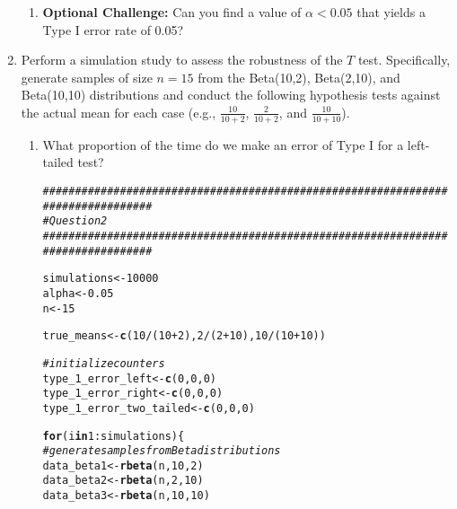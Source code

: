 \documentclass{article}\usepackage[]{graphicx}\usepackage[]{xcolor}
\makeatletter
\newcommand{\hlnum}[1]{\textcolor[rgb]{0.686,0.059,0.569}{#1}}%
\newcommand{\hlcom}[1]{\textcolor[rgb]{0.678,0.584,0.686}{\textit{#1}}}%
\newcommand{\hlopt}[1]{\textcolor[rgb]{0,0,0}{#1}}%
\newcommand{\hldef}[1]{\textcolor[rgb]{0.345,0.345,0.345}{#1}}%
\newcommand{\hlkwa}[1]{\textcolor[rgb]{0.161,0.373,0.58}{\textbf{#1}}}%
\newcommand{\hlkwb}[1]{\textcolor[rgb]{0.69,0.353,0.396}{#1}}%
\newcommand{\hlkwd}[1]{\textcolor[rgb]{0.737,0.353,0.396}{\textbf{#1}}}%
\newenvironment{kframe}{%
 \def\at@end@of@kframe{}%
 \ifinner\ifhmode%
  \def\at@end@of@kframe{\end{minipage}}%
  \begin{minipage}{\columnwidth}%
 \fi\fi%
 \def\FrameCommand##1{\hskip\@totalleftmargin \hskip-\fboxsep
 \colorbox{shadecolor}{##1}\hskip-\fboxsep
     \hskip-\linewidth \hskip-\@totalleftmargin \hskip\columnwidth}%
 \MakeFramed {\advance\hsize-\width
   \@totalleftmargin\z@ \linewidth\hsize
   \@setminipage}}%
 {\par\unskip\endMakeFramed%
 \at@end@of@kframe}
\newenvironment{knitrout}{}{} %
\makeatother
\begin{document}
\begin{enumerate}
\begin{enumerate}
  \item \textbf{Optional Challenge:} Can you find a value of $\alpha<0.05$ that yields a 
  Type I error rate of 0.05?
\end{enumerate}
  \item Perform a simulation study to assess the robustness of the $T$ test. 
  Specifically, generate samples of size $n=15$ from the Beta(10,2), Beta(2,10), 
  and Beta(10,10) distributions and conduct the following hypothesis tests against 
  the actual mean for each case (e.g., $\frac{10}{10+2}$, $\frac{2}{10+2}$, and 
  $\frac{10}{10+10}$). 
  \begin{enumerate}
    \item What proportion of the time do we make an error of Type I for a
    left-tailed test?
    
\begin{knitrout}\scriptsize
{}\color{fgcolor}\begin{kframe}
\begin{alltt}
    \hlcom{################################################################################}
  \hlcom{# Question 2}
  \hlcom{################################################################################}

  \hldef{simulations} \hlkwb{<-} \hlnum{10000}
  \hldef{alpha} \hlkwb{<-} \hlnum{0.05}
  \hldef{n} \hlkwb{<-} \hlnum{15}

  \hldef{true_means} \hlkwb{<-} \hlkwd{c}\hldef{(}\hlnum{10} \hlopt{/} \hldef{(}\hlnum{10}\hlopt{+}\hlnum{2}\hldef{),} \hlnum{2} \hlopt{/} \hldef{(}\hlnum{2}\hlopt{+}\hlnum{10}\hldef{),} \hlnum{10}\hlopt{/}\hldef{(}\hlnum{10}\hlopt{+}\hlnum{10}\hldef{))}

  \hlcom{# initialize counters}
  \hldef{type_1_error_left} \hlkwb{<-} \hlkwd{c}\hldef{(}\hlnum{0}\hldef{,}\hlnum{0}\hldef{,}\hlnum{0}\hldef{)}
  \hldef{type_1_error_right}\hlkwb{<-} \hlkwd{c}\hldef{(}\hlnum{0}\hldef{,}\hlnum{0}\hldef{,}\hlnum{0}\hldef{)}
  \hldef{type_1_error_two_tailed} \hlkwb{<-} \hlkwd{c}\hldef{(}\hlnum{0}\hldef{,}\hlnum{0}\hldef{,}\hlnum{0}\hldef{)}

  \hlkwa{for} \hldef{(i} \hlkwa{in} \hlnum{1}\hlopt{:}\hldef{simulations)\{}
    \hlcom{# generate samples from Beta distributions}
    \hldef{data_beta1} \hlkwb{<-} \hlkwd{rbeta}\hldef{(n,} \hlnum{10}\hldef{,} \hlnum{2}\hldef{)}
    \hldef{data_beta2} \hlkwb{<-} \hlkwd{rbeta}\hldef{(n,} \hlnum{2}\hldef{,} \hlnum{10}\hldef{)}
    \hldef{data_beta3} \hlkwb{<-} \hlkwd{rbeta}\hldef{(n,} \hlnum{10}\hldef{,} \hlnum{10}\hldef{)}


\end{alltt}
\end{kframe}
\end{knitrout}
\end{enumerate}
\end{enumerate}
\end{document}
